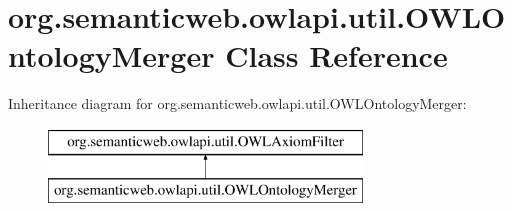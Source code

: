 \hypertarget{classorg_1_1semanticweb_1_1owlapi_1_1util_1_1_o_w_l_ontology_merger}{\section{org.\-semanticweb.\-owlapi.\-util.\-O\-W\-L\-Ontology\-Merger Class Reference}
\label{classorg_1_1semanticweb_1_1owlapi_1_1util_1_1_o_w_l_ontology_merger}
}
Inheritance diagram for org.\-semanticweb.\-owlapi.\-util.\-O\-W\-L\-Ontology\-Merger\-:\begin{figure}[H]
\begin{center}
\leavevmode
\includegraphics[height=2.000000cm]{classorg_1_1semanticweb_1_1owlapi_1_1util_1_1_o_w_l_ontology_merger}
\end{center}
\end{figure}
